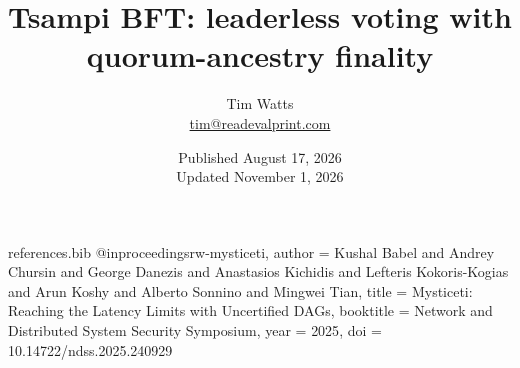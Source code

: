 \begin{filecontents*}{references.bib}
@inproceedings{rw-mysticeti,
  author = {Kushal Babel and Andrey Chursin and George Danezis and Anastasios Kichidis and Lefteris Kokoris-Kogias and Arun Koshy and Alberto Sonnino and Mingwei Tian},
  title = {Mysticeti: Reaching the Latency Limits with Uncertified {DAGs}},
  booktitle = {Network and Distributed System Security Symposium},
  year = {2025},
  doi = {10.14722/ndss.2025.240929}
}
\end{filecontents*}

\documentclass[twocolumn]{article}
\usepackage{preprint}
[preprint]
\raggedbottom
\usepackage[utf8]{inputenc}
\usepackage[T1]{fontenc}
\usepackage{courier}
\usepackage{amsmath,amssymb}
\usepackage{microtype}
\usepackage[numbers,square]{natbib}

\usepackage{hyperref}
\setlength{\emergencystretch}{3em}
\setcounter{secnumdepth}{3}
\newcommand{\qid}[1]{\operatorname{Q}_{#1}}
\newcommand{\height}{\operatorname{height}}

\title{Tsampi BFT: leaderless voting with quorum-ancestry finality}
\author{Tim Watts\\\href{mailto:tim@readevalprint.com}{tim@readevalprint.com}}
\date{Published August 17, 2026\\Updated November 1, 2026}
\usepackage{etoolbox}
\makeatletter
{}%
  {\PackageError{tsampi-bft}{Could not replace template date}{Check preprint.sty title formatting.}}
\patchcmd{\@maketitle}{\LARGE\sc}{\LARGE\bfseries}{}%
  {\PackageError{tsampi-bft}{Could not replace title small caps}{Check preprint.sty title formatting.}}
\patchcmd{\section}{\scshape}{\normalfont\bfseries}{}%
  {\PackageError{tsampi-bft}{Could not replace section small caps}{Check preprint.sty section formatting.}}
\patchcmd{\subsection}{\itshape}{\normalfont\bfseries}{}%
  {\PackageError{tsampi-bft}{Could not replace subsection styling}{Check preprint.sty subsection formatting.}}
\patchcmd{\subsubsection}{\itshape}{\normalfont\bfseries}{}%
  {\PackageError{tsampi-bft}{Could not replace subsubsection styling}{Check preprint.sty subsubsection formatting.}}
\patchcmd{\abstract}{\scshape}{}{}%
  {\PackageError{tsampi-bft}{Could not replace abstract small caps}{Check preprint.sty abstract formatting.}}
\makeatother


